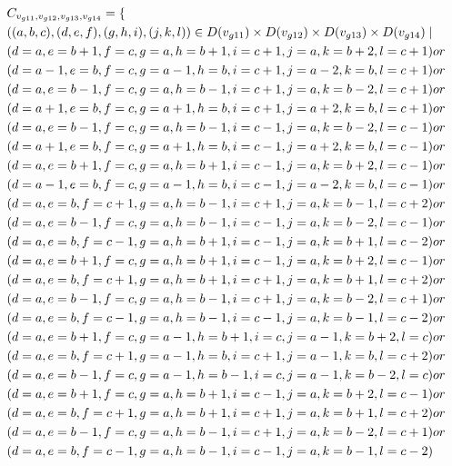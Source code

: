 \begin{align*}
&C_{v_{g11},v_{g12},v_{g13},v_{g14}}=\{\\
&((a,b,c),(d,e,f),(g,h,i),(j,k,l))\in D(v_{g11}) \times D(v_{g12})\times D(v_{g13})\times D(v_{g14})\mid\\
&(d=a ,e=b+1,f=c , g=a ,h=b+1,i=c+1,j=a ,k=b+2,l=c+1)or\\
&(d=a-1,e=b ,f=c , g=a-1,h=b ,i=c+1,j=a-2,k=b ,l=c+1)or\\
&(d=a ,e=b-1,f=c , g=a ,h=b-1,i=c+1,j=a ,k=b-2,l=c+1)or\\
&(d=a+1,e=b ,f=c , g=a+1,h=b ,i=c+1,j=a+2,k=b ,l=c+1)or\\
&(d=a ,e=b-1,f=c , g=a ,h=b-1,i=c-1,j=a ,k=b-2,l=c-1)or\\
&(d=a+1,e=b ,f=c , g=a+1,h=b ,i=c-1,j=a+2,k=b ,l=c-1)or\\
&(d=a ,e=b+1,f=c , g=a ,h=b+1,i=c-1,j=a ,k=b+2,l=c-1)or\\
&(d=a-1,e=b ,f=c , g=a-1,h=b ,i=c-1,j=a-2,k=b ,l=c-1)or\\
&(d=a ,e=b ,f=c+1, g=a ,h=b-1,i=c+1,j=a ,k=b-1,l=c+2)or\\
&(d=a ,e=b-1,f=c , g=a ,h=b-1,i=c-1,j=a ,k=b-2,l=c-1)or\\
&(d=a ,e=b ,f=c-1, g=a ,h=b+1,i=c-1,j=a ,k=b+1,l=c-2)or\\
&(d=a ,e=b+1,f=c , g=a ,h=b+1,i=c-1,j=a ,k=b+2,l=c-1)or\\
&(d=a ,e=b ,f=c+1, g=a ,h=b+1,i=c+1,j=a ,k=b+1,l=c+2)or\\
&(d=a ,e=b-1,f=c , g=a ,h=b-1,i=c+1,j=a ,k=b-2,l=c+1)or\\
&(d=a ,e=b ,f=c-1, g=a ,h=b-1,i=c-1,j=a ,k=b-1,l=c-2)or\\
&(d=a ,e=b+1,f=c , g=a-1,h=b+1,i=c ,j=a-1,k=b+2,l=c )or\\
&(d=a ,e=b ,f=c+1, g=a-1,h=b ,i=c+1,j=a-1,k=b ,l=c+2)or\\
&(d=a ,e=b-1,f=c , g=a-1,h=b-1,i=c ,j=a-1,k=b-2,l=c )or\\
&(d=a ,e=b+1,f=c , g=a ,h=b+1,i=c-1,j=a ,k=b+2,l=c-1)or\\
&(d=a ,e=b ,f=c+1, g=a ,h=b+1,i=c+1,j=a ,k=b+1,l=c+2)or\\
&(d=a ,e=b-1,f=c , g=a ,h=b-1,i=c+1,j=a ,k=b-2,l=c+1)or\\
&(d=a ,e=b ,f=c-1, g=a ,h=b-1,i=c-1,j=a ,k=b-1,l=c-2)
\end{align*}
